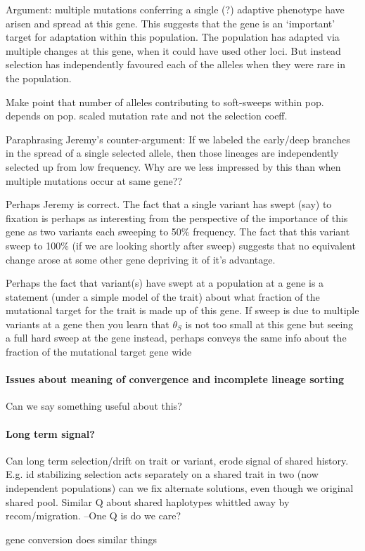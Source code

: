 \documentclass[a4paper,10pt]{article}
\begin{document}
Argument: multiple mutations conferring a single (?) adaptive
phenotype have arisen and spread at this gene. This suggests that the
gene is an `important' target for adaptation within this
population. The population has adapted via multiple changes at this
gene, when it could have used other loci. But instead selection has
independently favoured each of the alleles when they were rare in the population.

Make point that number of alleles contributing to soft-sweeps within
pop. depends on pop. scaled mutation rate and not the selection coeff.

Paraphrasing Jeremy's counter-argument: If we labeled the early/deep branches in the
spread of a single selected allele, then those lineages are
independently selected up from low frequency. Why are we less impressed by
this than when multiple mutations occur at same gene?? 

Perhaps Jeremy is correct. The fact that a single variant has swept
(say) to fixation is perhaps as interesting from the perspective of the
importance of this gene as two variants each sweeping to 50\%
frequency.  The fact that this variant sweep to 100\% (if we are
looking shortly after sweep) suggests that no equivalent change arose
at some other gene depriving it of it's advantage.

Perhaps the fact that variant(s) have swept at a population at a gene
is a statement (under a simple model of the trait) about what fraction
of the mutational target for the trait is made up of this gene. 
If sweep is due to multiple variants at a gene then you learn that
$\theta_S$ is not too small at this gene but seeing a full
hard sweep at the gene instead, perhaps conveys the same info about the fraction of the mutational target gene
wide

\paragraph{Issues about meaning of convergence and incomplete lineage sorting} 
Can we say something useful about this?


\paragraph{Long term signal?}
Can long term selection/drift on trait or variant, erode signal of shared
history. E.g. id stabilizing selection acts separately on a shared
trait in two (now independent populations) can we fix alternate
solutions, even though we original shared pool. Similar Q about shared
haplotypes whittled away by recom/migration. 
--One Q is do we care? 


gene conversion does similar things
\end{document}
